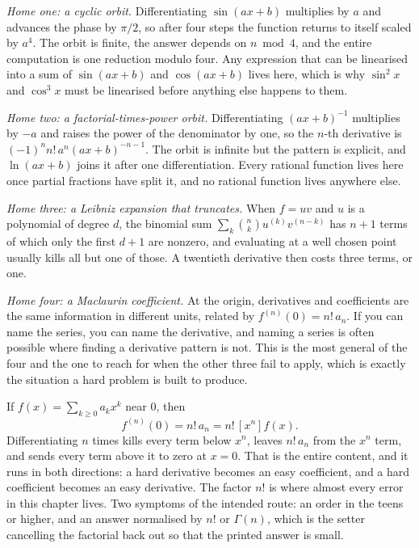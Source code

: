 \emph{Home one: a cyclic orbit.} Differentiating $\sin(ax+b)$ multiplies by $a$ and advances the phase by $\pi/2$, so after four steps the function returns to itself scaled by $a^{4}$. The orbit is finite, the answer depends on $n\bmod4$, and the entire computation is one reduction modulo four. Any expression that can be linearised into a sum of $\sin(ax+b)$ and $\cos(ax+b)$ lives here, which is why $\sin^{2}x$ and $\cos^{3}x$ must be linearised before anything else happens to them.

\emph{Home two: a factorial-times-power orbit.} Differentiating $(ax+b)^{-1}$ multiplies by $-a$ and raises the power of the denominator by one, so the $n$-th derivative is $(-1)^{n}n!\,a^{n}(ax+b)^{-n-1}$. The orbit is infinite but the pattern is explicit, and $\ln(ax+b)$ joins it after one differentiation. Every rational function lives here once partial fractions have split it, and no rational function lives anywhere else.

\emph{Home three: a Leibniz expansion that truncates.} When $f=uv$ and $u$ is a polynomial of degree $d$, the binomial sum $\sum_{k}\binom nk u^{(k)}v^{(n-k)}$ has $n+1$ terms of which only the first $d+1$ are nonzero, and evaluating at a well chosen point usually kills all but one of those. A twentieth derivative then costs three terms, or one.

\emph{Home four: a Maclaurin coefficient.} At the origin, derivatives and coefficients are the same information in different units, related by $f^{(n)}(0)=n!\,a_{n}$. If you can name the series, you can name the derivative, and naming a series is often possible where finding a derivative pattern is not. This is the most general of the four and the one to reach for when the other three fail to apply, which is exactly the situation a hard problem is built to produce.

\begin{keynote}
If $f(x)=\sum_{k\geq0}a_{k}x^{k}$ near $0$, then
\[
f^{(n)}(0)=n!\,a_{n}=n!\,[x^{n}]f(x).
\]
Differentiating $n$ times kills every term below $x^{n}$, leaves $n!\,a_{n}$ from the $x^{n}$ term, and sends every term above it to zero at $x=0$. That is the entire content, and it runs in both directions: a hard derivative becomes an easy coefficient, and a hard coefficient becomes an easy derivative. The factor $n!$ is where almost every error in this chapter lives. Two symptoms of the intended route: an order in the teens or higher, and an answer normalised by $n!$ or $\Gamma(n)$, which is the setter cancelling the factorial back out so that the printed answer is small.
\end{keynote}

